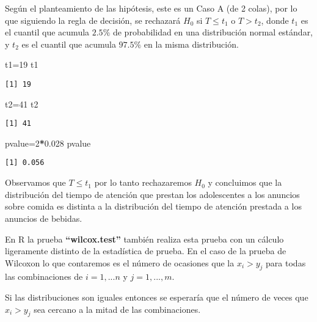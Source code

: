 \documentclass[
  a4paper,
  oneside,
  openany]{book}
\newenvironment{Shaded}{\begin{snugshade}}{\end{snugshade}}
\newcommand{\DecValTok}[1]{\textcolor[rgb]{0.00,0.00,0.81}{#1}}
\newcommand{\FloatTok}[1]{\textcolor[rgb]{0.00,0.00,0.81}{#1}}
\newcommand{\NormalTok}[1]{#1}
\newcommand{\OperatorTok}[1]{\textcolor[rgb]{0.81,0.36,0.00}{\textbf{#1}}}
\begin{document}
Según el planteamiento de las hipótesis, este es un Caso A (de 2 colas), por lo que siguiendo la regla de decisión, se rechazará \(H_0\) si \(T \leq t_1\) o \(T> t_2\), donde \(t_1\) es el cuantil que acumula \(2.5\%\) de probabilidad en una distribución normal estándar, y \(t_2\) es el cuantil que acumula \(97.5\%\) en la misma distribución.

\begin{Shaded}
\begin{Highlighting}[]
\NormalTok{t1=}\DecValTok{19}
\NormalTok{t1}
\end{Highlighting}
\end{Shaded}

\begin{verbatim}
[1] 19
\end{verbatim}

\begin{Shaded}
\begin{Highlighting}[]
\NormalTok{t2=}\DecValTok{41}
\NormalTok{t2}
\end{Highlighting}
\end{Shaded}

\begin{verbatim}
[1] 41
\end{verbatim}

\begin{Shaded}
\begin{Highlighting}[]
\NormalTok{pvalue=}\DecValTok{2}\OperatorTok{*}\FloatTok{0.028}
\NormalTok{pvalue}
\end{Highlighting}
\end{Shaded}

\begin{verbatim}
[1] 0.056
\end{verbatim}

Observamos que \(T \leq t_1\) por lo tanto rechazaremos \(H_0\) y concluimos que la distribución del tiempo de atención que prestan los adolescentes a los anuncios sobre comida es distinta a la distribución del tiempo de atención prestada a los anuncios de bebidas.

En R la prueba \textbf{``wilcox.test''} también realiza esta prueba con un cálculo ligeramente distinto de la estadística de prueba. En el caso de la prueba de Wilcoxon lo que contaremos es el número de ocasiones que la \(x_i>y_j\) para todas las combinaciones de \(i=1,...n\) y \(j=1,...,m\).

Si las distribuciones son iguales entonces se esperaría que el número de veces que \(x_i>y_j\) sea cercano a la mitad de las combinaciones.
\end{document}
